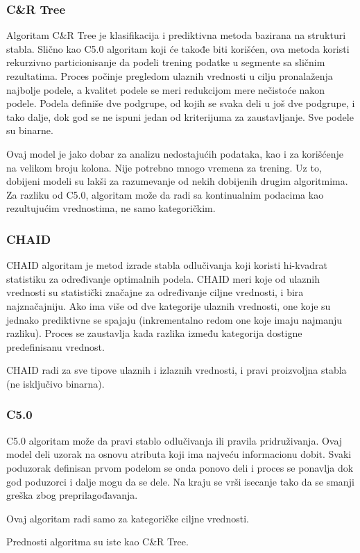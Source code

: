 \documentclass{article}
\begin{document}
\subsubsection{C\&R Tree}
Algoritam C\&R Tree je klasifikacija\cite{ibmcrt} i prediktivna metoda bazirana na strukturi stabla. Slično kao C5.0 algoritam koji će takođe biti korišćen, ova metoda koristi rekurzivno particionisanje da podeli trening podatke u segmente sa sličnim rezultatima. Proces počinje pregledom ulaznih vrednosti u cilju pronalaženja najbolje podele, a kvalitet podele se meri redukcijom mere nečistoće nakon podele. Podela definiše dve podgrupe, od kojih se svaka deli u još dve podgrupe, i tako dalje, dok god se ne ispuni jedan od kriterijuma za zaustavljanje. Sve podele su binarne.\par
Ovaj model je jako dobar za analizu nedostajućih podataka, kao i za korišćenje na velikom broju kolona. Nije potrebno mnogo vremena za trening. Uz to, dobijeni modeli su lakši za razumevanje od nekih dobijenih drugim algoritmima. Za razliku od C5.0, algoritam može da radi sa kontinualnim podacima kao rezultujućim vrednostima, ne samo kategoričkim.
\subsubsection{CHAID}
CHAID algoritam\cite{ibmchaid} je metod izrade stabla odlučivanja koji koristi hi-kvadrat statistiku za određivanje optimalnih podela. CHAID meri koje od ulaznih vrednosti su statistički značajne za određivanje ciljne vrednosti, i bira najznačajniju. Ako ima više od dve kategorije ulaznih vrednosti, one koje su jednako prediktivne se spajaju (inkrementalno redom one koje imaju najmanju razliku). Proces se zaustavlja kada razlika između kategorija dostigne predefinisanu vrednost.\par
CHAID radi za sve tipove ulaznih i izlaznih vrednosti, i pravi proizvoljna stabla (ne isključivo binarna).
\subsubsection{C5.0}
C5.0 algoritam\cite{ibmc50} može da pravi stablo odlučivanja ili pravila pridruživanja. Ovaj model deli uzorak na osnovu atributa koji ima najveću informacionu dobit. Svaki poduzorak definisan prvom podelom se onda ponovo deli i proces se ponavlja dok god poduzorci i dalje mogu da se dele. Na kraju se vrši isecanje tako da se smanji greška zbog preprilagođavanja.\par
Ovaj algoritam radi samo za kategoričke ciljne vrednosti.\par
Prednosti algoritma su iste kao C\&R Tree.
\end{document}
